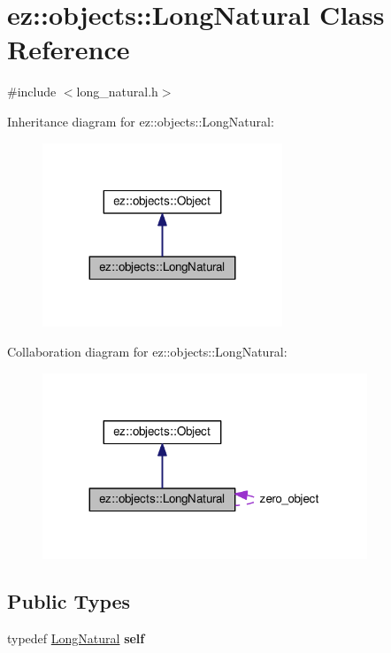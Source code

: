 \hypertarget{classez_1_1objects_1_1LongNatural}{}\section{ez\+:\+:objects\+:\+:Long\+Natural Class Reference}
\label{classez_1_1objects_1_1LongNatural}


{\ttfamily \#include $<$long\+\_\+natural.\+h$>$}



Inheritance diagram for ez\+:\+:objects\+:\+:Long\+Natural\+:
\nopagebreak
\begin{figure}[H]
\begin{center}
\leavevmode
\includegraphics[width=203pt]{classez_1_1objects_1_1LongNatural__inherit__graph}
\end{center}
\end{figure}


Collaboration diagram for ez\+:\+:objects\+:\+:Long\+Natural\+:
\nopagebreak
\begin{figure}[H]
\begin{center}
\leavevmode
\includegraphics[width=275pt]{classez_1_1objects_1_1LongNatural__coll__graph}
\end{center}
\end{figure}
\subsection*{Public Types}
\begin{DoxyCompactItemize}
\item 
\mbox{\label{classez_1_1objects_1_1LongNatural_ad1207a30d52155737cbaec52d3a0ab6b}} 
typedef \hyperlink{classez_1_1objects_1_1LongNatural}{Long\+Natural} {\bfseries self}
\end{DoxyCompactItemize}
